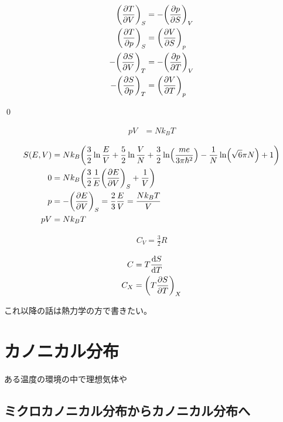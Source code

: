 \documentclass[uplatex,dvipdfmx,a4paper,11pt]{jlreq}
\makeatletter
\theoremstyle{definition}
\renewenvironment{proof}[1][\proofname]{\par
  \normalfont
  \topsep6\p@\@plus6\p@ \trivlist
  \item[\hskip\labelsep{\bfseries #1}\@addpunct{\bfseries}]\ignorespaces\quad\par
}{%
  \qed\endtrivlist\@endpefalse
}
\renewcommand\proofname{証明}
\makeatother
\begin{document}
\begin{proposition}
  \begin{align}
    \qty(\pdv{T}{V})_S  & = -\qty(\pdv{p}{S})_V \\
    \qty(\pdv{T}{p})_S  & = \qty(\pdv{V}{S})_p  \\
    -\qty(\pdv{S}{V})_T & = -\qty(\pdv{p}{T})_V \\
    -\qty(\pdv{S}{p})_T & = \qty(\pdv{V}{T})_p
  \end{align}
\end{proposition}
\begin{proof}

\end{proof}

\begin{theorem}[理想気体の状態方程式]
  \begin{align}
    pV & = Nk_BT
  \end{align}
\end{theorem}
\begin{align}
  S(E, V) & = Nk_B\qty(\frac{3}{2}\ln\frac{E}{V} + \frac{5}{2}\ln\frac{V}{N} + \frac{3}{2}\ln(\frac{me}{3\pi\hbar^2}) - \frac{1}{N}\ln(\sqrt{6}\pi N) + 1) \\
  0       & = Nk_B\qty(\frac{3}{2}\frac{1}{E}\qty(\pdv{E}{V})_S + \frac{1}{V})                                                                             \\
  p       & = -\qty(\pdv{E}{V})_S = \frac{2}{3}\frac{E}{V} = \frac{Nk_BT}{V}                                                                               \\
  pV      & = Nk_BT
\end{align}

\begin{align}
  C_V = \frac{3}{2}R
\end{align}

\begin{definition}[比熱]
  \begin{align}
    C   & = T\dv{S}{T}          \\
    C_X & = \qty(T\pdv{S}{T})_X
  \end{align}
\end{definition}
これ以降の話は熱力学の方で書きたい。

\section{カノニカル分布}
ある温度の環境の中で理想気体や
\subsection{ミクロカノニカル分布からカノニカル分布へ}
\end{document}
